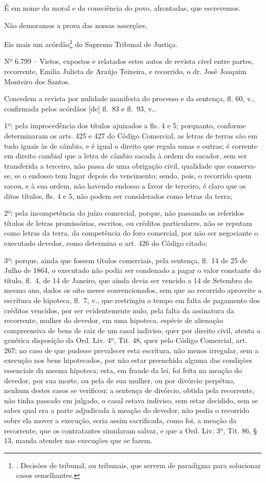É em nome da moral e da consciência do povo, afrontadas, que escrevemos.

Não demoramos a prova das nossas asserções.

Eis mais um acórdão\footnote{. Decisões de tribunal, ou tribunais, que
  servem de paradigma para solucionar casos semelhantes.} do Supremo
Tribunal de Justiça.

Nº 6.799 -- Vistos, expostos e relatados estes autos de revista cível
entre partes, recorrente, Emilia Julieta de Araújo Teixeira, e
recorrido, o dr. José Joaquim Monteiro dos Santos.

Concedem a revista por nulidade manifesta do processo e da sentença, fl.
60, v., confirmada pelos acórdãos {[}de{]} fl.~83 e fl.~93, v..

1º: pela improcedência dos títulos ajuizados a fls. 4 e 5; porquanto,
conforme determinaram os arts. 425 e 427 do Código Comercial, as letras
de terras são em tudo iguais às de câmbio, e é igual o direito que
regula umas e outras; é corrente em direito cambial que a letra de
câmbio sacada à ordem do sacador, sem ser transferida a terceiro, não
passa de uma obrigação civil, qualidade que conserva-se, se o endosso
tem lugar depois do vencimento; sendo, pois, o recorrido quem sacou, e à
sua ordem, não havendo endosso a favor de terceiro, é claro que os ditos
títulos, fls. 4 e 5, não podem ser considerados como letras da terra;

2º: pela incompetência do juízo comercial, porque, não passando os
referidos títulos de letras promissórias, escritos, ou créditos
particulares, não se reputam como letras da terra, da competência do
foro comercial, por não ser negociante o executado devedor, como
determina o art. 426 do Código citado;

3º: porque, ainda que fossem títulos comerciais, pela sentença, fl.~14
de 25 de Julho de 1864, o executado não podia ser condenado a pagar o
valor constante do título, fl.~4, de 14 de Janeiro, que ainda devia ser
vencido a 14 de Setembro do mesmo ano, dados os oito meses
convencionados, sem que ao recorrido aproveite a escritura de hipoteca,
fl.~7, v., que restringiu o tempo em falta de pagamento dos créditos
vencidos, por ser evidentemente nulo, pela falta da assinatura da
recorrente, mulher do devedor, em uma hipoteca, espécie de alienação
compreensiva de bens de raiz de um casal indiviso, quer por direito
civil, atenta a genérica disposição da Ord. Liv. 4º, Tit. 48, quer pelo
Código Comercial, art. 267; no caso de que pudesse prevalecer esta
escritura, não menos irregular, sem a execução nos bens hipotecados, por
não estar preenchida alguma das condições essenciais da mesma hipoteca;
esta, em fraude da lei, foi feita na meação do devedor, por sua morte,
ou pela de sua mulher, ou por divórcio perpétuo, nenhum destes casos se
verificou; a sentença de divórcio, obtida pela recorrente, não tinha
passado em julgado, o casal estava indiviso, sem estar decidido, sem se
saber qual era a parte adjudicada à meação do devedor, não podia o
recorrido sobre ela mover a execução, seria assim sacrificada, como foi,
a meação da recorrente, que os contratantes simularam salvar, e que a
Ord. Liv. 3º, Tit. 86, § 13, manda atender nas execuções que se fazem.

